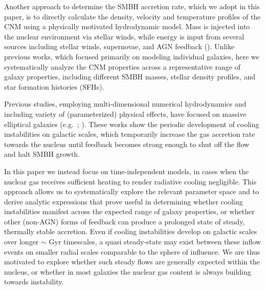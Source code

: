 \documentclass[usenatbib,fleqn]{mn2e}
\begin{document}

Another approach to determine the SMBH accretion rate, which we adopt
in this paper, is to directly calculate the density, velocity and
temperature profiles of the CNM using a physically motivated
hydrodynamic model.  Mass is injected into the nuclear environment via
stellar winds, while energy is input from several sources
including stellar winds, supernovae, and AGN feedback
(\citealt{Quataert:2004a,De-ColleGuillochon+:2012a,ShcherbakovWong+:2014a}).
Unlike previous works, which focused primarily on modeling individual
galaxies, here we systematically analyze the CNM properties across a representative
range of galaxy properties, including different SMBH masses, stellar
density profiles, and star formation histories (SFHs).

Previous studies, employing multi-dimensional numerical hydrodynamics and
including variety of (parameterized) physical effects, have focused on
massive elliptical galaxies (e.g.~\citealt{Ciotti&Ostriker07};
\citealt{Ciotti+10}).  These works show the periodic
development of cooling instabilities on galactic scales, which
temporarily increase the gas accretion rate towards the nucleus until
feedback becomes strong enough to shut off the flow and halt
SMBH growth.  

In this paper we instead focus on time-independent models, in cases when the nuclear gas receives sufficient heating to render radiative cooling negligible.  This approach allows us to systematically explore the relevant parameter
space and to derive analytic expressions that prove useful in
determining whether cooling instabilities manifest across the expected
range of galaxy properties, or whether other (non-AGN) forms of
feedback can produce a prolonged state of steady, thermally stable
accretion.  Even if cooling instabilities develop on galactic scales
over longer $\sim$ Gyr timescales, a quasi steady-state may exist
between these inflow events on smaller radial scales comparable to the
sphere of influence.  We are thus motivated to explore whether such
steady flows are generally expected within the nucleus, or
whether in most galaxies the nuclear gas content is always building
towards instability.
\end{document}
